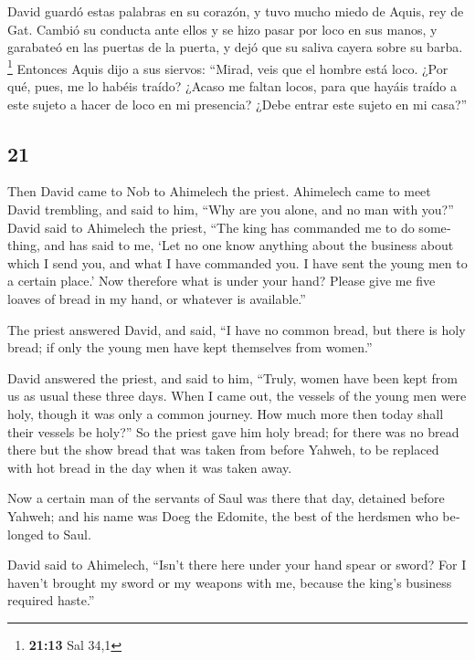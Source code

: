 \begin{paracol}{2}
 David guardó estas palabras en su corazón, y tuvo mucho
miedo de Aquis, rey de Gat.  Cambió su conducta ante
ellos y se hizo pasar por loco en sus manos, y garabateó en las puertas
de la puerta, y dejó que su saliva cayera sobre su barba. \footnote{\textbf{21:13}
  Sal 34,1}  Entonces Aquis dijo a sus siervos: ``Mirad,
veis que el hombre está loco. ¿Por qué, pues, me lo habéis traído?
 ¿Acaso me faltan locos, para que hayáis traído a este
sujeto a hacer de loco en mi presencia? ¿Debe entrar este sujeto en mi
casa?''

\switchcolumn
\begin{otherlanguage}{english}

\hypertarget{section-41}{%
\section{21}\label{section-41}}

 Then David came to Nob to Ahimelech the priest. Ahimelech
came to meet David trembling, and said to him, ``Why are you alone, and
no man with you?''  David said to Ahimelech the priest,
``The king has commanded me to do something, and has said to me, `Let no
one know anything about the business about which I send you, and what I
have commanded you. I have sent the young men to a certain place.'
 Now therefore what is under your hand? Please give me
five loaves of bread in my hand, or whatever is available.''

 The priest answered David, and said, ``I have no common
bread, but there is holy bread; if only the young men have kept
themselves from women.''

 David answered the priest, and said to him, ``Truly,
women have been kept from us as usual these three days. When I came out,
the vessels of the young men were holy, though it was only a common
journey. How much more then today shall their vessels be holy?''
 So the priest gave him holy bread; for there was no bread
there but the show bread that was taken from before Yahweh, to be
replaced with hot bread in the day when it was taken away.

 Now a certain man of the servants of Saul was there that
day, detained before Yahweh; and his name was Doeg the Edomite, the best
of the herdsmen who belonged to Saul.

 David said to Ahimelech, ``Isn't there here under your
hand spear or sword? For I haven't brought my sword or my weapons with
me, because the king's business required haste.''


\end{otherlanguage}
\end{paracol}
